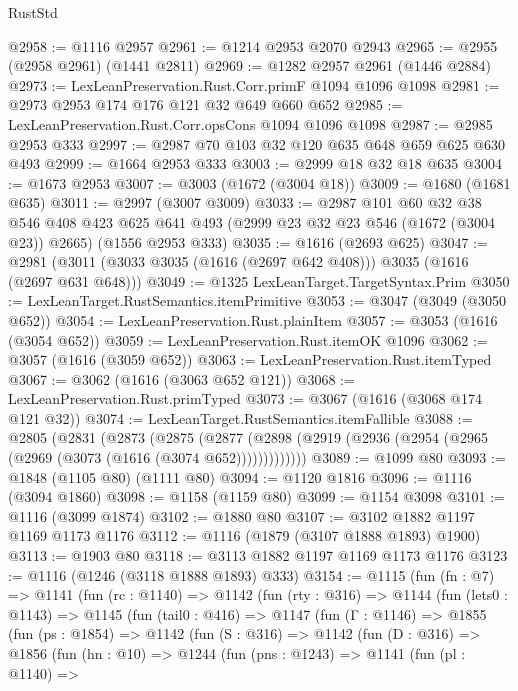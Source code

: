 \begin{lexlean}{RustStd}
\begin{coremodule}
{\begin{coremodule}
{{{{{{{{{{{@2958 := @1116 @2957
@2961 := @1214 @2953 @2070 @2943
@2965 := @2955 (@2958 @2961) (@1441 @2811)
@2969 := @1282 @2957 @2961 (@1446 @2884)
@2973 := LexLeanPreservation.Rust.Corr.primF @1094 @1096 @1098
@2981 := @2973 @2953 @174 @176 @121 @32 @649 @660 @652
@2985 := LexLeanPreservation.Rust.Corr.opsCons @1094 @1096 @1098
@2987 := @2985 @2953 @333
@2997 := @2987 @70 @103 @32 @120 @635 @648 @659 @625 @630 @493
@2999 := @1664 @2953 @333
@3003 := @2999 @18 @32 @18 @635
@3004 := @1673 @2953
@3007 := @3003 (@1672 (@3004 @18))
@3009 := @1680 (@1681 @635)
@3011 := @2997 (@3007 @3009)
@3033 := @2987
    @101
    @60
    @32
    @38
    @546
    @408
    @423
    @625
    @641
    @493
    (@2999 @23 @32 @23 @546 (@1672 (@3004 @23)) @2665)
    (@1556 @2953 @333)
@3035 := @1616 (@2693 @625)
@3047 := @2981 (@3011 (@3033 @3035 (@1616 (@2697 @642 @408))) @3035 (@1616 (@2697 @631 @648)))
@3049 := @1325 LexLeanTarget.TargetSyntax.Prim
@3050 := LexLeanTarget.RustSemantics.itemPrimitive
@3053 := @3047 (@3049 (@3050 @652))
@3054 := LexLeanPreservation.Rust.plainItem
@3057 := @3053 (@1616 (@3054 @652))
@3059 := LexLeanPreservation.Rust.itemOK @1096
@3062 := @3057 (@1616 (@3059 @652))
@3063 := LexLeanPreservation.Rust.itemTyped
@3067 := @3062 (@1616 (@3063 @652 @121))
@3068 := LexLeanPreservation.Rust.primTyped
@3073 := @3067 (@1616 (@3068 @174 @121 @32))
@3074 := LexLeanTarget.RustSemantics.itemFallible
@3088 := @2805
    (@2831
      (@2873
        (@2875
          (@2877 (@2898 (@2919 (@2936 (@2954 (@2965 (@2969 (@3073 (@1616 (@3074 @652)))))))))))))
@3089 := @1099 @80
@3093 := @1848 (@1105 @80) (@1111 @80)
@3094 := @1120 @1816
@3096 := @1116 (@3094 @1860)
@3098 := @1158 (@1159 @80)
@3099 := @1154 @3098
@3101 := @1116 (@3099 @1874)
@3102 := @1880 @80
@3107 := @3102 @1882 @1197 @1169 @1173 @1176
@3112 := @1116 (@1879 (@3107 @1888 @1893) @1900)
@3113 := @1903 @80
@3118 := @3113 @1882 @1197 @1169 @1173 @1176
@3123 := @1116 (@1246 (@3118 @1888 @1893) @333)
@3154 := @1115
    (fun (fn : @7) =>
    @1141
      (fun (rc : @1140) =>
      @1142
        (fun (rty : @316) =>
        @1144
          (fun (lets0 : @1143) =>
          @1145
            (fun (tail0 : @416) =>
            @1147
              (fun (Γ : @1146) =>
              @1855
                (fun (ps : @1854) =>
                @1142
                  (fun (S : @316) =>
                  @1142
                    (fun (D : @316) =>
                    @1856
                      (fun (hn : @10) =>
                      @1244
                        (fun (pns : @1243) =>
                        @1141
                          (fun (pl : @1140) =>
}}}}}}}}}}}
\end{coremodule}}
\end{coremodule}
\end{lexlean}
